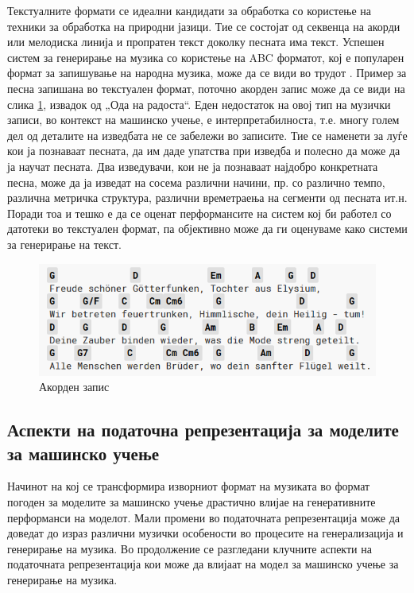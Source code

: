 Текстуалните формати се идеални кандидати за обработка со користење на техники за обработка на природни јазици. Тие се состојат од секвенца на акорди или мелодиска линија и пропратен текст доколку песната има текст. Успешен систем за генерирање на музика со користење на ABC форматот, кој е популарен формат за запишување на народна музика, може да се види во трудот \cite{Sturm2015}. Пример за песна запишана во текстуален формат, поточно акорден запис може да се види на слика \ref{fig:akordi}, извадок од „Ода на радоста“. Еден недостаток на овој тип на музички записи, во контекст на машинско учење, е интерпретабилноста, т.е. многу голем дел од деталите на изведбата не се забележи во записите. Тие се наменети за луѓе кои ја познаваат песната, да им даде упатства при изведба и полесно да може да ја научат песната. Два изведувачи, кои не ја познаваат најдобро конкретната песна, може да ја изведат на сосема различни начини, пр. со различно темпо, различна метричка структура, различни времетраења на сегменти од песната ит.н. Поради тоа и тешко е да се оценат перформансите на систем кој би работел со датотеки во текстуален формат, па објективно може да ги оценуваме како системи за генерирање на текст.

\begin{figure}[H]
	\centering
\includegraphics[scale=0.9]{images/ode_to_joy.png}
	\caption{Акорден запис}
	\label{fig:akordi}
\end{figure}

\subsection{Аспекти на податочна репрезентација за моделите за машинско учење}

Начинот на кој се трансформира изворниот формат на музиката во формат погоден за моделите за машинско учење драстично влијае на генеративните перформанси на моделот. Мали промени во податочната репрезентација може да доведат до израз различни музички особености во процесите на генерализација и генерирање на музика. Во продолжение се разгледани клучните аспекти на податочната репрезентација кои може да влијаат на модел за машинско учење за генерирање на музика.

